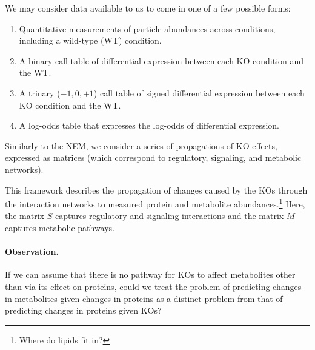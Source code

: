\documentclass{article}
\begin{document}
We may consider data available to us to come in one of a few possible forms:
\begin{enumerate}
 \item Quantitative measurements of particle abundances across conditions, including a wild-type (WT) condition.
 \item A binary call table of differential expression between each KO condition and the WT.
 \item A trinary ($-1, 0, +1$) call table of signed differential expression between each KO condition and the WT.
 \item A log-odds table that expresses the log-odds of differential expression.
\end{enumerate}

Similarly to the NEM, we consider a series of propagations of KO effects, expressed as matrices (which correspond to regulatory, signaling, and metabolic networks).


This framework describes the propagation of changes caused by the KOs through the interaction networks to measured protein and metabolite abundances.\footnote{Where do lipids fit in?}
Here, the matrix $S$ captures regulatory and signaling interactions and the matrix $M$ captures metabolic pathways.

\paragraph{Observation.} If we can assume that there is no pathway for KOs to affect metabolites other than via its effect on proteins, could we treat the problem of predicting changes in metabolites given changes in proteins as a distinct problem from that of predicting changes in proteins given KOs?
\end{document}
